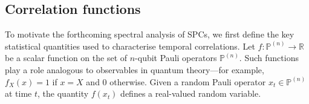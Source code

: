 
\subsection{Correlation functions}
To motivate the forthcoming spectral analysis of SPCs, we first define the key statistical quantities used to characterise temporal correlations. Let \(f : \mathbb{P}^{(n)} \to \mathbb{R}\) be a scalar function on the set of \(n\)-qubit Pauli operators \(\mathbb{P}^{(n)}\). Such functions play a role analogous to observables in quantum theory---for example, \(f_X(x) = 1\) if \(x=X\) and 0 otherwise. Given a random Pauli operator \(x_t \in \mathbb{P}^{(n)}\) at time \(t\), the quantity \(f(x_t)\) defines a real-valued random variable.

